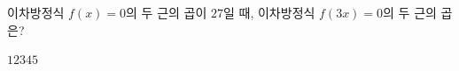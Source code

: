이차방정식 $f(x)=0$의 두 근의 곱이 $27$일 때, 이차방정식 $f(3x)=0$의 두 근의 곱은?
\begin{choices32}{$1$}{$2$}{$3$}{$4$}{$5$}\end{choices32}
